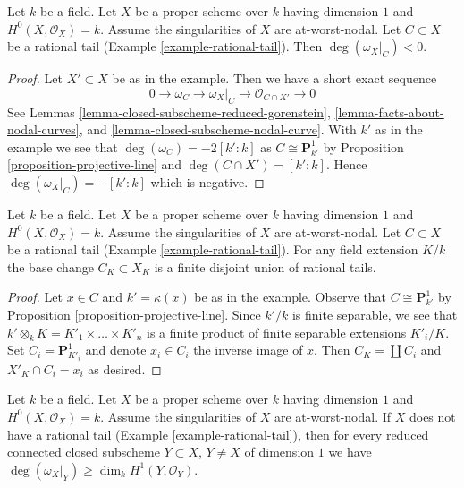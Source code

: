\begin{lemma}
\label{lemma-rational-tail-negative}
Let $k$ be a field. Let $X$ be a proper scheme over $k$ having dimension $1$
and $H^0(X, \mathcal{O}_X) = k$. Assume the singularities of $X$ are
at-worst-nodal. Let $C \subset X$ be a rational tail
(Example \ref{example-rational-tail}). Then $\deg(\omega_X|_C) < 0$.
\end{lemma}

\begin{proof}
Let $X' \subset X$ be as in the example. Then we have a short exact
sequence
$$
0 \to \omega_C \to \omega_X|_C \to \mathcal{O}_{C \cap X'} \to 0
$$
See Lemmas \ref{lemma-closed-subscheme-reduced-gorenstein},
\ref{lemma-facts-about-nodal-curves}, and
\ref{lemma-closed-subscheme-nodal-curve}.
With $k'$ as in the example we see that $\deg(\omega_C) = -2[k' : k]$
as $C \cong \mathbf{P}^1_{k'}$ by Proposition \ref{proposition-projective-line}
and $\deg(C \cap X') = [k' : k]$.
Hence $\deg(\omega_X|_C) = -[k' : k]$ which is negative.
\end{proof}

\begin{lemma}
\label{lemma-rational-tail-field-extension}
Let $k$ be a field. Let $X$ be a proper scheme over $k$ having dimension $1$
and $H^0(X, \mathcal{O}_X) = k$. Assume the singularities of $X$ are
at-worst-nodal. Let $C \subset X$ be a rational tail
(Example \ref{example-rational-tail}).
For any field extension $K/k$ the base change $C_K \subset X_K$
is a finite disjoint union of rational tails.
\end{lemma}

\begin{proof}
Let $x \in C$ and $k' = \kappa(x)$ be as in the example.
Observe that $C \cong \mathbf{P}^1_{k'}$ by
Proposition \ref{proposition-projective-line}.
Since $k'/k$ is finite separable, we see that
$k' \otimes_k K = K'_1 \times \ldots \times K'_n$
is a finite product of finite separable extensions $K'_i/K$.
Set $C_i = \mathbf{P}^1_{K'_i}$ and denote $x_i \in C_i$
the inverse image of $x$. Then $C_K = \coprod C_i$ and
$X'_K \cap C_i = x_i$ as desired.
\end{proof}

\begin{lemma}
\label{lemma-no-rational-tail}
Let $k$ be a field. Let $X$ be a proper scheme over $k$ having dimension $1$
and $H^0(X, \mathcal{O}_X) = k$. Assume the singularities of $X$ are
at-worst-nodal. If $X$ does not have a rational tail
(Example \ref{example-rational-tail}),
then for every reduced connected closed subscheme
$Y \subset X$, $Y \not = X$ of dimension $1$ we have
$\deg(\omega_X|_Y) \geq \dim_k H^1(Y, \mathcal{O}_Y)$.
\end{lemma}

